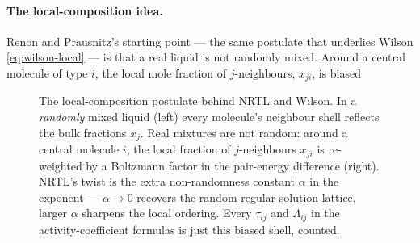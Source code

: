 \documentclass[11pt,a4paper]{article}
\begin{document}
\paragraph{The local-composition idea.}
Renon and Prausnitz's \cite{Renon} starting point --- the same
postulate that underlies Wilson \eqref{eq:wilson-local} --- is that a
real liquid is not randomly mixed. Around a central molecule of type
$i$, the local mole fraction of $j$-neighbours, $x_{ji}$, is biased

\begin{figure}[ht]\centering
{}
\caption{The local-composition postulate behind NRTL and Wilson.  In a
\emph{randomly} mixed liquid (left) every molecule's neighbour shell
reflects the bulk fractions $x_j$.  Real mixtures are not random: around
a central molecule $i$, the local fraction of $j$-neighbours $x_{ji}$ is
re-weighted by a Boltzmann factor in the pair-energy difference (right).
NRTL's twist is the extra non-randomness constant $\alpha$ in the
exponent --- $\alpha\to0$ recovers the random regular-solution lattice,
larger $\alpha$ sharpens the local ordering.  Every $\tau_{ij}$ and
$\Lambda_{ij}$ in the activity-coefficient formulas is just this biased
shell, counted.}
\label{fig:local-composition-lattice}
\end{figure}
\end{document}
